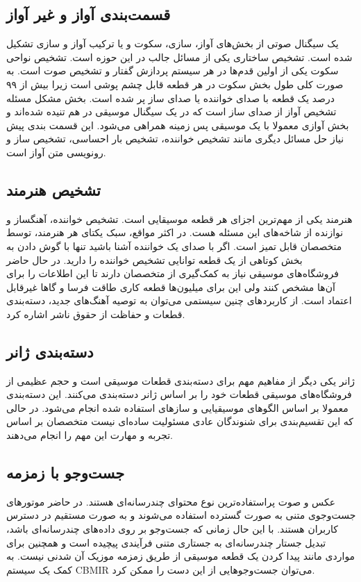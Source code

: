 \subsection{قسمت‌بندی آواز و غیر آواز}
یک سیگنال صوتی از بخش‌های آواز، سازی، سکوت و یا ترکیب آواز و سازی تشکیل شده است.
تشخیص ساختاری یکی از مسائل جالب در این حوزه است. تشخیص نواحی سکوت یکی از اولین
قدم‌ها در هر سیستم پردازش گفتار و تشخیص صوت است. به صورت کلی طول بخش سکوت در هر
قطعه قابل چشم پوشی است زیرا بیش از ۹۹ درصد یک قطعه با صدای خواننده یا صدای ساز
پر شده است. بخش مشکل مسئله تشخیص آواز از صدای ساز است که در یک سیگنال موسیقی در
هم تنیده شده‌اند و بخش آوازی معمولا با یک موسیقی پس زمینه همراهی می‌شود. این
قسمت بندی پیش نیاز حل مسائل دیگری مانند تشخیص خواننده، تشخیص بار احساسی، تشخیص
ساز و رونویسی متن آواز است.

\subsection{تشخیص هنرمند}
هنرمند یکی از مهم‌ترین اجزای هر قطعه موسیقایی است. تشخیص خواننده، آهنگساز و
نوازنده از شاخه‌های این مسئله هست. در اکثر مواقع، سبک یکتای هر هنرمند، توسط
متخصصان قابل تمیز است. اگر با صدای یک خواننده آشنا باشید تنها با گوش دادن به بخش
کوتاهی از یک قطعه توانایی تشخیص خواننده را دارید. در حال حاضر فروشگاه‌های موسیقی
نیاز به کمک‌گیری از متخصصان دارند تا این اطلاعات را برای آن‌ها مشخص کنند ولی این
برای میلیون‌ها قطعه کاری طاقت فرسا و گاها غیرقابل اعتماد است. از کاربردهای چنین
سیستمی می‌توان به توصیه آهنگ‌های جدید، دسته‌بندی قطعات و حفاظت از حقوق ناشر
اشاره کرد.

\subsection{دسته‌بندی ژانر}
ژانر یکی دیگر از مفاهیم مهم برای دسته‌بندی قطعات موسیقی است و حجم عظیمی از
فروشگاه‌های موسیقی قطعات خود را بر اساس ژانر دسته‌بندی می‌کنند. این دسته‌بندی
معمولا بر اساس الگوهای موسیقیایی و سازهای استفاده شده انجام می‌شود. در حالی که
این تقسیم‌بندی برای شنوندگان عادی مسئولیت ساده‌ای نیست متخصصان بر اساس تجربه و
مهارت این مهم را انجام می‌دهند.

\subsection{جست‌وجو با زمزمه}
عکس و صوت پراستفاده‌ترین نوع محتوای چندرسانه‌ای هستند. در حاضر موتورهای جست‌وجوی
متنی به صورت گسترده استفاده می‌شوند و به صورت مستقیم در دسترس کاربران هستند. با
این حال زمانی که جست‌وجو بر روی داده‌های چندرسانه‌ای باشد، تبدیل جستار
چندرسانه‌ای به جستاری متنی فرآیندی پیچیده است و همچنین برای مواردی مانند پیدا
کردن یک قطعه موسیقی از طریق زمزمه موزیک آن شدنی نیست. به کمک یک سیستم
\gls{CBMIR} می‌توان جست‌وجوهایی از این دست را ممکن کرد.

